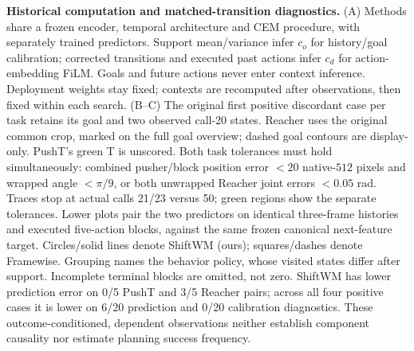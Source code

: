 \textbf{Historical computation and matched-transition diagnostics.} (A) Methods share a frozen encoder, temporal architecture and CEM procedure, with separately trained predictors. Support mean/variance infer $c_o$ for history/goal calibration; corrected transitions and executed past actions infer $c_d$ for action-embedding FiLM. Goals and future actions never enter context inference. Deployment weights stay fixed; contexts are recomputed after observations, then fixed within each search. (B--C) The original first positive discordant case per task retains its goal and two observed call-20 states. Reacher uses the original common crop, marked on the full goal overview; dashed goal contours are display-only. PushT's green T is unscored. Both task tolerances must hold simultaneously: combined pusher/block position error $<20$ native-$512$ pixels and wrapped angle $<\pi/9$, or both unwrapped Reacher joint errors $<0.05$ rad. Traces stop at actual calls 21/23 versus 50; green regions show the separate tolerances. Lower plots pair the two predictors on identical three-frame histories and executed five-action blocks, against the same frozen canonical next-feature target. Circles/solid lines denote ShiftWM (ours); squares/dashes denote Framewise. Grouping names the behavior policy, whose visited states differ after support. Incomplete terminal blocks are omitted, not zero. ShiftWM has lower prediction error on 0/5 PushT and 3/5 Reacher pairs; across all four positive cases it is lower on 6/20 prediction and 0/20 calibration diagnostics. These outcome-conditioned, dependent observations neither establish component causality nor estimate planning success frequency.
